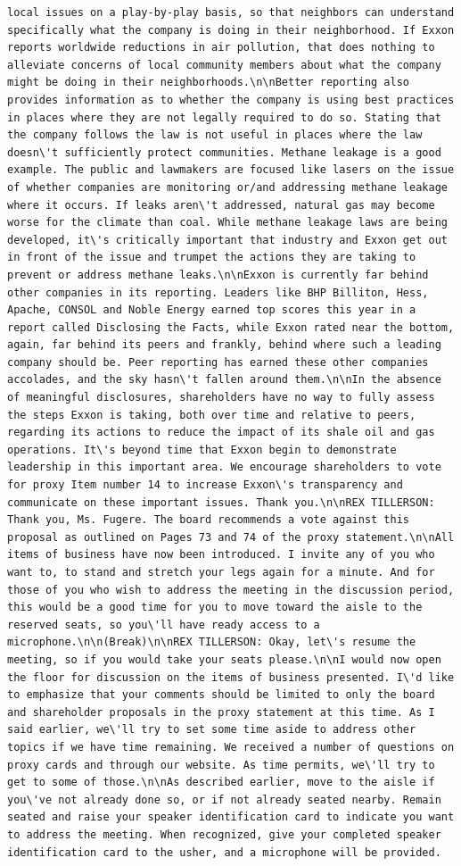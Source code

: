 \documentclass[
  letterpaper,
  DIV=11,
  numbers=noendperiod]{scrreprt}
\begin{document}
\begin{verbatim}
local issues on a play-by-play basis, so that neighbors can understand specifically what the company is doing in their neighborhood. If Exxon reports worldwide reductions in air pollution, that does nothing to alleviate concerns of local community members about what the company might be doing in their neighborhoods.\n\nBetter reporting also provides information as to whether the company is using best practices in places where they are not legally required to do so. Stating that the company follows the law is not useful in places where the law doesn\'t sufficiently protect communities. Methane leakage is a good example. The public and lawmakers are focused like lasers on the issue of whether companies are monitoring or/and addressing methane leakage where it occurs. If leaks aren\'t addressed, natural gas may become worse for the climate than coal. While methane leakage laws are being developed, it\'s critically important that industry and Exxon get out in front of the issue and trumpet the actions they are taking to prevent or address methane leaks.\n\nExxon is currently far behind other companies in its reporting. Leaders like BHP Billiton, Hess, Apache, CONSOL and Noble Energy earned top scores this year in a report called Disclosing the Facts, while Exxon rated near the bottom, again, far behind its peers and frankly, behind where such a leading company should be. Peer reporting has earned these other companies accolades, and the sky hasn\'t fallen around them.\n\nIn the absence of meaningful disclosures, shareholders have no way to fully assess the steps Exxon is taking, both over time and relative to peers, regarding its actions to reduce the impact of its shale oil and gas operations. It\'s beyond time that Exxon begin to demonstrate leadership in this important area. We encourage shareholders to vote for proxy Item number 14 to increase Exxon\'s transparency and communicate on these important issues. Thank you.\n\nREX TILLERSON: Thank you, Ms. Fugere. The board recommends a vote against this proposal as outlined on Pages 73 and 74 of the proxy statement.\n\nAll items of business have now been introduced. I invite any of you who want to, to stand and stretch your legs again for a minute. And for those of you who wish to address the meeting in the discussion period, this would be a good time for you to move toward the aisle to the reserved seats, so you\'ll have ready access to a microphone.\n\n(Break)\n\nREX TILLERSON: Okay, let\'s resume the meeting, so if you would take your seats please.\n\nI would now open the floor for discussion on the items of business presented. I\'d like to emphasize that your comments should be limited to only the board and shareholder proposals in the proxy statement at this time. As I said earlier, we\'ll try to set some time aside to address other topics if we have time remaining. We received a number of questions on proxy cards and through our website. As time permits, we\'ll try to get to some of those.\n\nAs described earlier, move to the aisle if you\'ve not already done so, or if not already seated nearby. Remain seated and raise your speaker identification card to indicate you want to address the meeting. When recognized, give your completed speaker identification card to the usher, and a microphone will be provided. 
\end{verbatim}
\end{document}
